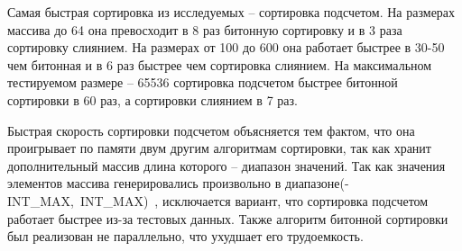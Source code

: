 Самая быстрая сортировка из исследуемых -- сортировка подсчетом. На размерах массива до 64 она превосходит в 8 раз битонную сортировку и в 3 раза сортировку слиянием. На размерах от 100 до 600 она работает быстрее в 30-50 чем битонная и в 6 раз быстрее чем сортировка слиянием. На максимальном тестируемом размере -- 65536 сортировка подсчетом быстрее битонной сортировки в 60 раз, а сортировки слиянием в 7 раз.  

Быстрая скорость сортировки подсчетом объясняется тем фактом, что она проигрывает по памяти двум другим алгоритмам сортировки, так как хранит дополнительный массив длина которого -- диапазон значений. Так как значения элементов массива генерировались произвольно в диапазоне\hspace{6mm}(-INT\_MAX,~INT\_MAX)~\cite{si}, исключается вариант, что сортировка подсчетом работает быстрее из-за тестовых данных. Также алгоритм битонной сортировки был реализован не параллельно, что ухудшает его трудоемкость.

